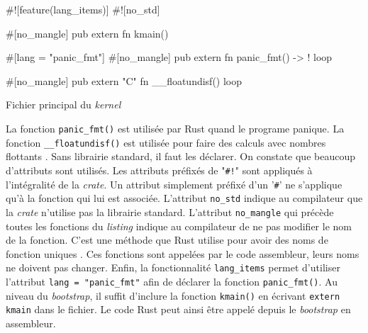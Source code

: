\begin{code}
\begin{rustcode}
#![feature(lang_items)]
#![no_std]
    
#[no_mangle]
pub extern fn kmain() {}

#[lang = "panic_fmt"]
#[no_mangle]
pub extern fn panic_fmt() -> ! {
    loop {}
}

#[no_mangle]
pub extern "C" fn __floatundisf() {
    loop {}
}
\end{rustcode}
\caption{Fichier principal du \textit{kernel}}
\label{lst:exec:kmain}
\end{code} \bigbreak

La fonction \texttt{panic_fmt()} est utilisée par Rust quand le programe
panique. La fonction \texttt{__floatundisf()} est utilisée pour faire
des calculs avec nombres flottants \cite{ref6}. Sans librairie standard, il faut
les déclarer. On constate que beaucoup d'attributs sont utilisés. Les
attributs préfixés de "\texttt{#!}" sont appliqués à l'intégralité de
la \textit{crate}. Un attribut simplement préfixé d'un '\texttt{#}' ne
s'applique qu'à la fonction qui lui est associée. L'attribut \texttt{no_std}
indique au compilateur que la \textit{crate} n'utilise pas la librairie standard.
L'attribut \texttt{no_mangle} qui précède toutes les fonctions du \textit{listing}
indique au compilateur de ne pas modifier le nom de la fonction. C'est une méthode
que Rust utilise pour avoir des noms de fonction uniques \cite{ref8}. Ces fonctions sont
appelées par le code assembleur, leurs noms ne doivent pas changer. Enfin, la fonctionnalité
\texttt{lang_items} permet d'utiliser l'attribut \texttt{lang = "panic_fmt"}
afin de déclarer la fonction \texttt{panic_fmt()}. Au niveau du \textit{bootstrap},
il suffit d'inclure la fonction \texttt{kmain()} en écrivant
\texttt{extern kmain} dans le fichier. Le code Rust peut ainsi être appelé
depuis le \textit{bootstrap} en assembleur.


